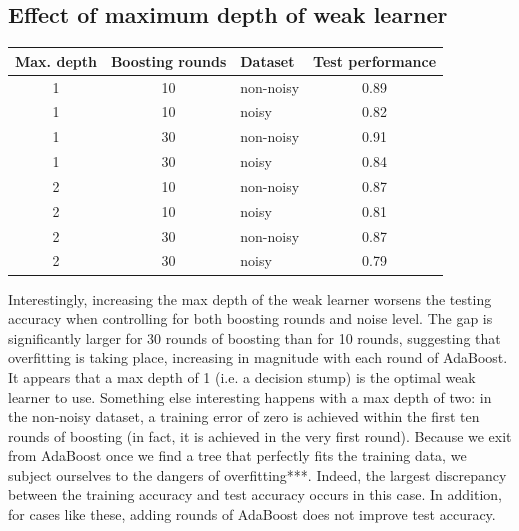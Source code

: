 \documentclass[11pt]{article}
\begin{document}
\subsection{Effect of maximum depth of weak learner}
\begin{center}
\begin{tabular}{c c l c}
Max. depth & Boosting rounds & Dataset & Test performance \\ \hline
1 & 10 & non-noisy & 0.89 \\ \hline
1 & 10 & noisy & 0.82 \\ \hline
1 & 30 & non-noisy & 0.91 \\ \hline
1 & 30 & noisy & 0.84 \\ \hline \hline
2 & 10 & non-noisy & 0.87 \\ \hline
2 & 10 & noisy & 0.81 \\ \hline
2 & 30 & non-noisy & 0.87 \\ \hline
2 & 30 & noisy & 0.79 \\ \hline
\end{tabular}
\end{center}
Interestingly, increasing the max depth of the weak learner worsens the testing accuracy when controlling for both boosting rounds and noise level. The gap is significantly larger for 30 rounds of boosting than for 10 rounds, suggesting that overfitting is taking place, increasing in magnitude with each round of AdaBoost. It appears that a max depth of 1 (i.e. a decision stump) is the optimal weak learner to use. Something else interesting happens with a max depth of two: in the non-noisy dataset, a training error of zero is achieved within the first ten rounds of boosting (in fact, it is achieved in the very first round). Because we exit from AdaBoost once we find a tree that perfectly fits the training data, we subject ourselves to the dangers of overfitting***. Indeed, the largest discrepancy between the training accuracy and test accuracy occurs in this case. In addition, for cases like these, adding rounds of AdaBoost does not improve test accuracy.
\end{document}
